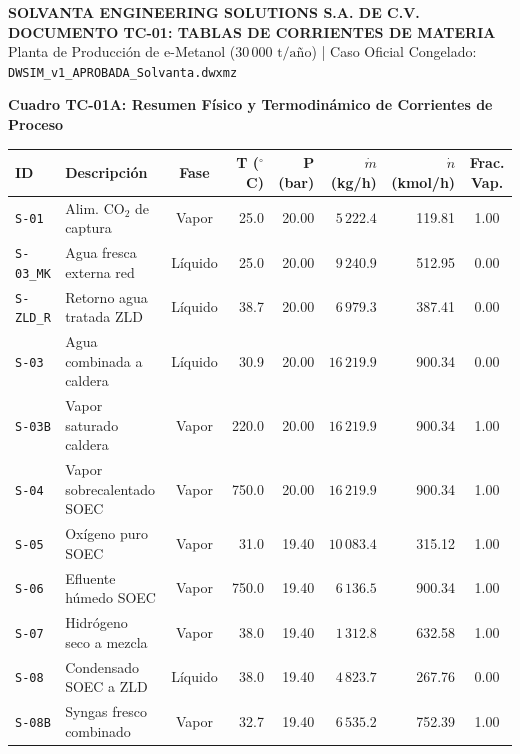\documentclass[11pt,letterpaper]{article}
\begin{document}
\begin{center}
{\large \textbf{SOLVANTA ENGINEERING SOLUTIONS S.A. DE C.V.}}\\[0.2cm]
{\Large \textbf{\color{navyblue} DOCUMENTO TC-01: TABLAS DE CORRIENTES DE MATERIA}}\\[0.1cm]
{\small Planta de Producción de e-Metanol ($30\,000\text{ t/año}$) | Caso Oficial Congelado: \texttt{DWSIM\_v1\_APROBADA\_Solvanta.dwxmz}}
\end{center}

\vspace{0.2cm}
\noindent\textbf{Cuadro TC-01A: Resumen Físico y Termodinámico de Corrientes de Proceso}
\begin{center}
\footnotesize
\setlength{\tabcolsep}{3.5pt}
\begin{tabularx}{\textwidth}{lp{4.2cm}crrrrc}
\toprule
\textbf{ID} & \textbf{Descripción} & \textbf{Fase} & \textbf{T ($^\circ$C)} & \textbf{P (bar)} & \textbf{$\dot{m}$ (kg/h)} & \textbf{$\dot{n}$ (kmol/h)} & \textbf{Frac. Vap.} \\
\midrule
\texttt{S-01} & Alim. $\text{CO}_2$ de captura & Vapor & 25.0 & 20.00 & $5\,222.4$ & 119.81 & 1.00 \\
\texttt{S-03\_MK} & Agua fresca externa red & Líquido & 25.0 & 20.00 & $9\,240.9$ & 512.95 & 0.00 \\
\texttt{S-ZLD\_R} & Retorno agua tratada ZLD & Líquido & 38.7 & 20.00 & $6\,979.3$ & 387.41 & 0.00 \\
\texttt{S-03} & Agua combinada a caldera & Líquido & 30.9 & 20.00 & $16\,219.9$ & 900.34 & 0.00 \\
\texttt{S-03B} & Vapor saturado caldera & Vapor & 220.0 & 20.00 & $16\,219.9$ & 900.34 & 1.00 \\
\texttt{S-04} & Vapor sobrecalentado SOEC & Vapor & 750.0 & 20.00 & $16\,219.9$ & 900.34 & 1.00 \\
\texttt{S-05} & Oxígeno puro SOEC & Vapor & 31.0 & 19.40 & $10\,083.4$ & 315.12 & 1.00 \\
\texttt{S-06} & Efluente húmedo SOEC & Vapor & 750.0 & 19.40 & $6\,136.5$ & 900.34 & 1.00 \\
\texttt{S-07} & Hidrógeno seco a mezcla & Vapor & 38.0 & 19.40 & $1\,312.8$ & 632.58 & 1.00 \\
\texttt{S-08} & Condensado SOEC a ZLD & Líquido & 38.0 & 19.40 & $4\,823.7$ & 267.76 & 0.00 \\
\texttt{S-08B} & Syngas fresco combinado & Vapor & 32.7 & 19.40 & $6\,535.2$ & 752.39 & 1.00 \\

\end{tabularx}
\end{center}
\end{document}

